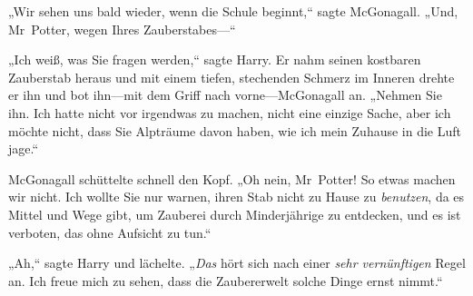 „Wir sehen uns bald wieder, wenn die Schule beginnt,“ sagte McGonagall. „Und, Mr~Potter, wegen Ihres Zauberstabes—“

„Ich weiß, was Sie fragen werden,“ sagte Harry. Er nahm seinen kostbaren Zauberstab heraus und mit einem tiefen, stechenden Schmerz im Inneren drehte er ihn und bot ihn—mit dem Griff nach vorne—McGonagall an. „Nehmen Sie ihn. Ich hatte nicht vor irgendwas zu machen, nicht eine einzige Sache, aber ich möchte nicht, dass Sie Alpträume davon haben, wie ich mein Zuhause in die Luft jage.“

McGonagall schüttelte schnell den Kopf. „Oh nein, Mr~Potter! So etwas machen wir nicht. Ich wollte Sie nur warnen, ihren Stab nicht zu Hause zu \emph{benutzen}, da es Mittel und Wege gibt, um Zauberei durch Minderjährige zu entdecken, und es ist verboten, das ohne Aufsicht zu tun.“

„Ah,“ sagte Harry und lächelte. „\emph{Das} hört sich nach einer \emph{sehr vernünftigen} Regel an. Ich freue mich zu sehen, dass die Zaubererwelt solche Dinge ernst nimmt.“

